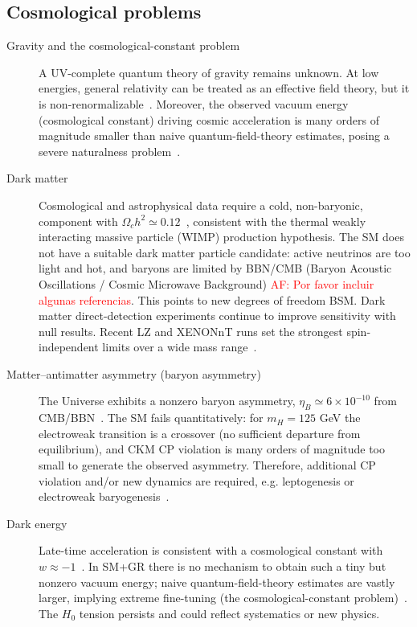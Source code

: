 \subsection{Cosmological problems}
\begin{description}
		\item[Gravity and the cosmological-constant problem] A UV-complete quantum theory of gravity remains unknown. At low energies, general relativity can be treated as an effective field theory, but it is non-renormalizable~\parencite{Donoghue:1994EFT,Burgess:2004QG}. Moreover, the observed vacuum energy (cosmological constant) driving cosmic acceleration is many orders of magnitude smaller than naive quantum-field-theory estimates, posing a severe naturalness problem~\parencite{Weinberg:1989CC}.

  \item[Dark matter] Cosmological and astrophysical data require a cold, non-baryonic,  component with $\Omega_c h^2 \simeq 0.12$~\parencite{Planck2018}, consistent with the thermal weakly interacting massive particle (WIMP) production hypothesis. The SM does not have a  suitable dark matter particle candidate: active neutrinos are too light and hot, and baryons are limited by BBN/CMB (Baryon Acoustic Oscillations / Cosmic Microwave Background) \textcolor{red}{AF: Por favor incluir algunas referencias}. This points to new degrees of freedom BSM. Dark matter direct-detection experiments continue to improve sensitivity with null results. Recent LZ and XENONnT runs set the strongest spin-independent limits over a wide mass range~\parencite{LZ:2022first,LZ:2023full,XENONnT:2023}.

  \item[Matter--antimatter asymmetry (baryon asymmetry)] The Universe exhibits a nonzero baryon asymmetry, $\eta_B \simeq 6\times10^{-10}$ from CMB/BBN~\parencite{Planck2018}. The SM fails quantitatively: for $m_H=125$ GeV the electroweak transition is a crossover (no sufficient departure from equilibrium), and CKM CP violation is many orders of magnitude too small to generate the observed asymmetry. Therefore, additional CP violation and/or new dynamics are required, e.g. leptogenesis or electroweak baryogenesis~\parencite{Sakharov:1967,Davidson:2008Leptogenesis,Morrissey:2012EWB}.

  \item[Dark energy] Late-time acceleration is consistent with a cosmological constant with $w\approx -1$~\parencite{DESIY1:2024}. In SM+GR there is no mechanism to obtain such a tiny but nonzero vacuum energy; naive quantum-field-theory estimates are vastly larger, implying extreme fine-tuning (the cosmological-constant problem)~\parencite{Weinberg:1989CC}. The $H_0$ tension persists and could reflect systematics or new physics.
\end{description}

